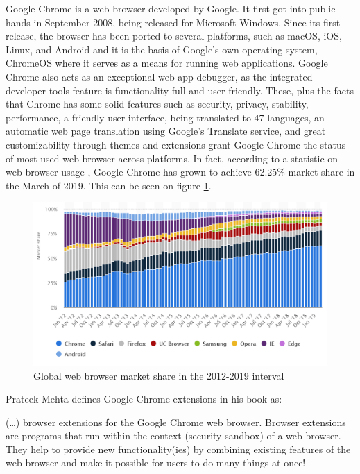 \documentclass[12pt,a4paper,twoside]{report}
\begin{document}
Google Chrome is a web browser developed by Google. It first got into public hands in September 2008, being released for Microsoft Windows. Since its first release, the browser has been ported to several platforms, such as macOS, iOS, Linux, and Android and it is the basis of Google's own operating system, ChromeOS where it serves as a means for running web applications. Google Chrome also acts as an exceptional web app debugger, as the integrated developer tools feature is functionality-full and user friendly. These, plus the facts that Chrome has some solid features such as security, privacy, stability, performance, a friendly user interface, being translated to 47 languages, an automatic web page translation using Google's Translate service, and great customizability through themes and extensions grant Google Chrome the status of most used web browser across platforms. In fact, according to a statistic on web browser usage \cite{browser_market_share_2019}, Google Chrome has grown to achieve 62.25\% market share in the March of 2019. This can be seen on figure \ref{fig:browser_market_share_2019}.

\begin{figure}[ht]
  \centering
  \includegraphics[width=\linewidth]{img/browser_market_share_2019.png}
  \caption[]{Global web browser market share in the 2012-2019 interval \footnotemark[5]}
  \label{fig:browser_market_share_2019}
\end{figure}


Prateek Mehta defines Google Chrome extensions in his book \cite{creating_google_chrome_extensions} as:
\begin{displayquote}
  (\dots) browser extensions for the Google Chrome web browser.
  Browser extensions are programs that run within the context (security sandbox) of a web
  browser. They help to provide new functionality(ies) by combining existing features of the
  web browser and make it possible for users to do many things at once!
\end{displayquote}
\end{document}
